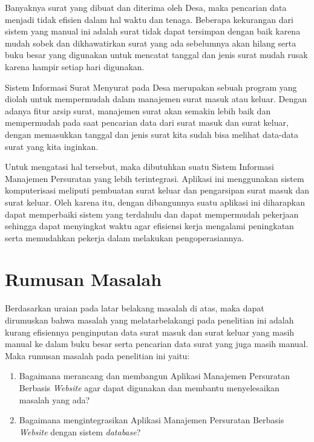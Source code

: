 Banyaknya surat yang dibuat dan diterima oleh Desa, maka pencarian data menjadi tidak efisien dalam hal waktu dan tenaga. Beberapa kekurangan dari sistem yang manual ini adalah surat tidak dapat tersimpan dengan baik karena mudah sobek dan dikhawatirkan surat yang ada sebelumnya akan hilang serta buku besar yang digunakan untuk mencatat tanggal dan jenis surat mudah rusak karena hampir setiap hari digunakan.

Sistem Informasi Surat Menyurat pada Desa merupakan sebuah program yang diolah untuk mempermudah dalam manajemen surat masuk atau keluar. Dengan adanya fitur arsip surat, manajemen surat akan semakin lebih baik dan mempermudah pada saat pencarian data dari surat masuk dan surat keluar, dengan memasukkan tanggal dan jenis surat kita sudah bisa melihat data-data surat yang kita inginkan.

Untuk mengatasi hal tersebut, maka dibutuhkan suatu Sistem Informasi Manajemen Persuratan yang lebih terintegrasi. Aplikasi ini menggunakan sistem komputerisasi meliputi pembuatan surat keluar dan pengarsipan surat masuk dan surat keluar. Oleh karena itu, dengan dibangunnya suatu aplikasi ini diharapkan dapat memperbaiki sistem yang terdahulu dan dapat mempermudah pekerjaan sehingga dapat menyingkat waktu agar efisiensi kerja mengalami peningkatan serta memudahkan pekerja dalam melakukan pengoperasiannya.

\section{Rumusan Masalah}

Berdasarkan uraian pada latar belakang masalah di atas, maka dapat dirumuskan bahwa masalah yang melatarbelakangi pada penelitian ini adalah kurang efisiennya penginputan data surat masuk dan surat keluar yang masih manual ke dalam buku besar serta pencarian data surat yang juga masih manual. Maka rumusan masalah pada penelitian ini yaitu:

\begin{enumerate}[topsep=0pt,itemsep=0pt,partopsep=0pt, parsep=0pt]
    \item Bagaimana merancang dan membangun Aplikasi Manajemen Persuratan Berbasis \textit{Website} agar dapat digunakan dan membantu menyelesaikan masalah yang ada?
    \item Bagaimana mengintegrasikan Aplikasi Manajemen Persuratan Berbasis \textit{Website} dengan sistem \textit{database}?
\end{enumerate}

